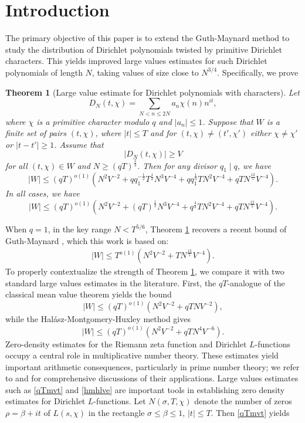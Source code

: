 \documentclass[12pt]{amsart}
\newtheorem{theorem}{Theorem}[section]
\theoremstyle{definition}
\theoremstyle{plain}
\theoremstyle{remark}
\numberwithin{equation}{section}
\numberwithin{theorem}{section}
\numberwithin{equation}{section}
\begin{document}
	\section{Introduction}\label{intro}
	The primary objective of this paper is to extend the Guth-Maynard method to study the distribution of Dirichlet polynomials twisted by primitive Dirichlet characters. This yields improved large values estimates for such Dirichlet polynomials of length $N$, taking values of size close to $N^{3/4}$. Specifically, we prove
	\begin{theorem}[Large value estimate for Dirichlet polynomials with characters]\label{Partial LVE} Let
		\[
		D_{N}(t, \chi)=\sum_{N < n \leq 2N} a_{n}\chi(n)n^{it},
		\]
		where $\chi$ is a primitive character modulo $q$ and $|a_{n}| \leq1$. Suppose that $W$ is a finite set of pairs $(t, \chi)$,  where $|t| \leq T$ and for $(t, \chi)\neq (t', \chi')$ either $\chi \neq \chi'$ or $|t-t'|\geq 1$. Assume that
		\[ |D_{N}(t, \chi)| \geq V
		\]
		for all $(t, \chi) \in W$ and $N \geq(qT)^{\frac{2}{3}}$.
		Then for any divisor $q_1 \mid q$, we have 
		\[ |W| \leq (qT)^{o(1)} (N^{2}V^{-2}+ qq_1^{-\frac{1}{2}}T^{\frac{1}{2}}N^{3}V^{-4}+ q q_1^{\frac{1}{3}}TN^{2}V^{-4} + qTN^{\frac{12}{5}}V^{-4}).
		\]
		In all cases, we have
		\[ |W| \leq (qT)^{o(1)}(N^{2}V^{-2}+(qT)^{\frac{1}{2}}N^{3}V^{-4}+q^{\frac{4}{3}}TN^{2}V^{-4}+qTN^{\frac{12}{5}}V^{-4}).
		\]
	\end{theorem}
	When $q=1$, in the key range $N<T^{5/6}$, Theorem \ref{Partial LVE} recovers a recent bound of Guth-Maynard \cite{GM}, which this work is based on:
	\begin{align}
		|W| \leq T^{o(1)}(N^2V^{-2}+TN^{\frac{12}{5}}V^{-4}). \label{GM bound}
	\end{align}
	To properly contextualize the strength of Theorem \ref{Partial LVE}, we compare it with two standard large values estimates in the literature. First, the $qT$-analogue of the classical mean value theorem \cite[Thm 9.12]{iwanieckowalski} yields the bound
	\begin{equation}\label{qTmvt}
		|W| \leq (qT)^{o(1)}(N^{2}V^{-2}+qTNV^{-2}),
	\end{equation}
	while the Halász-Montgomery-Huxley method \cite{Huxley1975} gives 
	\begin{equation}\label{hmhlve}
		|W| \leq (qT)^{o(1)}(N^{2}V^{-2}+qTN^{4}V^{-6}).
	\end{equation}
	Zero-density estimates for the Riemann zeta function and Dirichlet $L$-functions occupy a central role in multiplicative number theory. These estimates yield important arithmetic consequences, particularly in prime number theory; we refer to \cite[Chapter 12]{Ivicbook} and \cite[Chapter 15]{MontgomeryBook} for comprehensive discussions of their applications. Large values estimates such as \eqref{qTmvt} and \eqref{hmhlve} are important tools in establishing zero density estimates for Dirichlet $L$-functions. Let $N(\sigma, T, \chi)$ denote the number of zeros $\rho = \beta + it$ of $L(s, \chi)$ in the rectangle $\sigma \leq \beta \leq 1$, $|t| \leq T$. Then \eqref{qTmvt} yields
\end{document}
